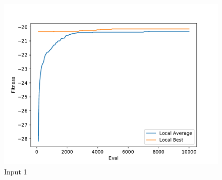 \documentclass{standalone}
\begin{document}
\begin{figure}[!htb]
	\caption{Input 1}
	\label{fig:graph_1037}
	\includegraphics[width=\textwidth]{../graphs/graphs/1037.pdf}
\end{figure}
\end{document}
